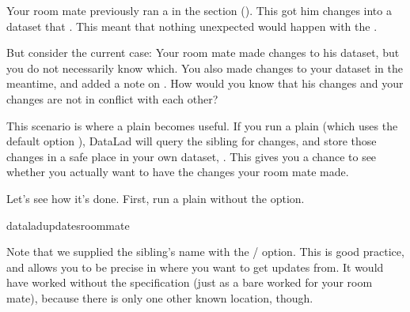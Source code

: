 \sphinxAtStartPar
Your room mate previously ran a  in the section
{\hyperref[\detokenize{basics/101-119-sharelocal4:update}]{}} (). This got him
changes  into a dataset that .
This meant that nothing unexpected would happen with the
.

\sphinxAtStartPar
But consider the current case: Your room mate made changes to his
dataset, but you do not necessarily know which. You also made
changes to your dataset in the meantime, and added a note on
.
How would you know that his changes and
your changes are not in conflict with each other?

\sphinxAtStartPar
This scenario is where a plain  becomes useful.
If you run a plain  (which uses the default option ), DataLad will query the sibling
for changes, and store those changes in a safe place in your own
dataset, .
This gives you a chance to see whether you actually want to have the
changes your room mate made.

\ignorespaces 
\sphinxAtStartPar
Let’s see how it’s done. First, run a plain  without
the  option.

\begin{sphinxVerbatim}[commandchars=\\\{\}]
dataladupdate\PYGZhy{}sroommate
\end{sphinxVerbatim}

\sphinxAtStartPar
Note that we supplied the sibling’s name with the / option.
This is good practice, and allows you to be precise in where you want to get
updates from. It would have worked without the specification (just as a bare
 worked for your room mate), because there is only
one other known location, though.

